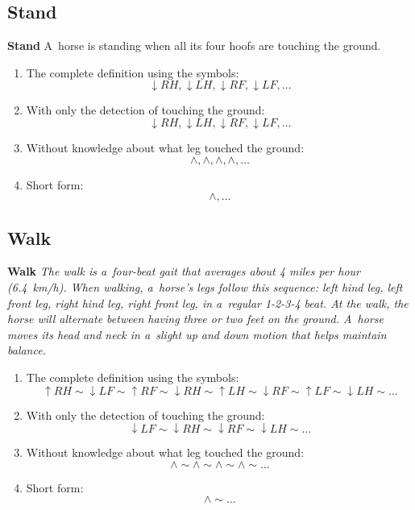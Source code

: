 \subsection{Stand}
\begin{definition}{\textbf{Stand}}
    \label{def:stand}
    A~horse is standing when all its four hoofs are touching the ground. \cite{Harrisc1993}
    
    \begin{enumerate}
        \item The complete definition using the symbols:
        $$ \downarrow RH, \downarrow LH, \downarrow RF, \downarrow LF, \dots $$
        \item With only the detection of touching the ground:
        $$ \downarrow RH, \downarrow LH, \downarrow RF, \downarrow LF, \dots $$
        \item Without knowledge about what leg touched the ground:
        $$ \wedge, \wedge, \wedge, \wedge, \dots $$
        \item Short form:
        $$ \wedge, \dots $$
    \end{enumerate}
\end{definition}

\subsection{Walk}
\begin{definition}{\textbf{Walk}}
    \label{def:walk}
    \textit{The walk is a~four-beat gait that averages about 4 miles per hour (\SI{6.4}{km/h}). When walking, a~horse's legs follow this sequence: left hind leg, left front leg, right hind leg, right front leg, in a~regular 1-2-3-4 beat. At the walk, the horse will alternate between having three or two feet on the ground. A~horse moves its head and neck in a~slight up and down motion that helps maintain balance.} \cite{Harrisc1993}
    
    \begin{enumerate}
        \item The complete definition using the symbols:
        $$ \uparrow RH \sim \downarrow LF \sim \uparrow RF \sim \downarrow RH \sim \uparrow LH \sim \downarrow RF \sim \uparrow LF \sim \downarrow LH \sim \dots $$
        \item With only the detection of touching the ground:
        $$ \downarrow LF \sim \downarrow RH \sim \downarrow RF \sim \downarrow LH \sim \dots $$
        \item Without knowledge about what leg touched the ground:
        $$ \wedge \sim \wedge \sim \wedge \sim \wedge \sim \dots $$
        \item Short form:
        $$ \wedge \sim \dots $$
    \end{enumerate}
\end{definition}

